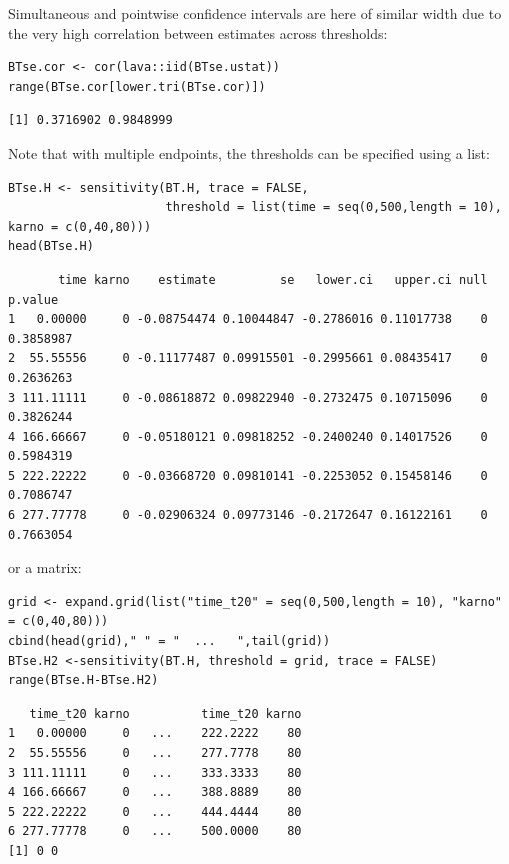 \documentclass[12pt]{article}
\begin{document}
Simultaneous and pointwise confidence intervals are here of similar
width due to the very high correlation between estimates across
thresholds:
\lstset{language=r,label= ,caption= ,captionpos=b,numbers=none}
\begin{lstlisting}
BTse.cor <- cor(lava::iid(BTse.ustat))
range(BTse.cor[lower.tri(BTse.cor)])
\end{lstlisting}

\begin{verbatim}
[1] 0.3716902 0.9848999
\end{verbatim}


Note that with multiple endpoints, the thresholds can be specified using a list:
\lstset{language=r,label= ,caption= ,captionpos=b,numbers=none}
\begin{lstlisting}
BTse.H <- sensitivity(BT.H, trace = FALSE,
                      threshold = list(time = seq(0,500,length = 10), karno = c(0,40,80)))
head(BTse.H)
\end{lstlisting}

\begin{verbatim}
       time karno    estimate         se   lower.ci   upper.ci null   p.value
1   0.00000     0 -0.08754474 0.10044847 -0.2786016 0.11017738    0 0.3858987
2  55.55556     0 -0.11177487 0.09915501 -0.2995661 0.08435417    0 0.2636263
3 111.11111     0 -0.08618872 0.09822940 -0.2732475 0.10715096    0 0.3826244
4 166.66667     0 -0.05180121 0.09818252 -0.2400240 0.14017526    0 0.5984319
5 222.22222     0 -0.03668720 0.09810141 -0.2253052 0.15458146    0 0.7086747
6 277.77778     0 -0.02906324 0.09773146 -0.2172647 0.16122161    0 0.7663054
\end{verbatim}


or a matrix:

\lstset{language=r,label= ,caption= ,captionpos=b,numbers=none}
\begin{lstlisting}
grid <- expand.grid(list("time_t20" = seq(0,500,length = 10), "karno" = c(0,40,80)))
cbind(head(grid)," " = "  ...   ",tail(grid))
BTse.H2 <-sensitivity(BT.H, threshold = grid, trace = FALSE)
range(BTse.H-BTse.H2)
\end{lstlisting}

\begin{verbatim}
   time_t20 karno          time_t20 karno
1   0.00000     0   ...    222.2222    80
2  55.55556     0   ...    277.7778    80
3 111.11111     0   ...    333.3333    80
4 166.66667     0   ...    388.8889    80
5 222.22222     0   ...    444.4444    80
6 277.77778     0   ...    500.0000    80
[1] 0 0
\end{verbatim}
\end{document}
